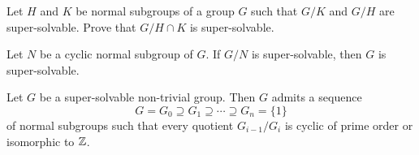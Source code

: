\begin{exercise}
\label{xca:super}
Let $H$ and $K$ be normal subgroups of a group $G$ such that $G/K$ and $G/H$
are super-solvable. Prove that $G/H\cap K$ is super-solvable. 
\end{exercise}


\begin{exercise}
\label{xca:Nciclico}
Let $N$ be a cyclic normal subgroup of $G$. If $G/N$ is super-solvable, then 
$G$ is super-solvable. 
\end{exercise}



\begin{theorem}
\label{thm:ZorCp}
Let $G$ be a super-solvable non-trivial group. Then $G$ admits a sequence 
\[
G=G_0\supseteq G_1\supseteq\cdots\supseteq G_n=\{1\}
\]
of normal subgroups 
such that every quotient $G_{i-1}/G_i$ is cyclic of prime order or isomorphic to 
$\mathbb{Z}$.
\end{theorem}

